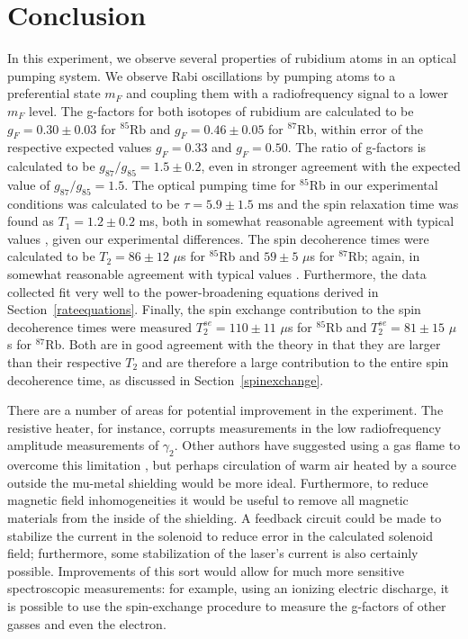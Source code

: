 
\section{Conclusion}\label{conclusion}

In this experiment, we observe several properties of rubidium atoms in an optical pumping system. We observe Rabi oscillations by pumping atoms to a preferential state $m_{F}$ and coupling them with a radiofrequency signal to a lower $m_{F}$ level. The g-factors for both isotopes of rubidium are calculated to be $g_{F}=0.30\pm0.03$ for $^{85}$Rb and $g_{F}=0.46\pm0.05$ for $^{87}$Rb, within error of the respective expected values $g_{F}=0.33$ and $g_{F}=0.50$. The ratio of g-factors is calculated to be $g_{87}/g_{85}=1.5\pm0.2$, even in stronger agreement with the expected value of $g_{87}/g_{85}=1.5$. The optical pumping time for $^{85}$Rb in our experimental conditions was calculated to be $\tau = 5.9\pm 1.5$ ms and the spin relaxation time was found as $T_{1}=1.2 \pm 0.2$ ms, both in somewhat reasonable agreement with typical values \cite{vanier}, given our experimental differences. The spin decoherence times were calculated to be $T_2 = 86 \pm 12$ $\mu$s for $^{85}$Rb and $59 \pm 5$ $\mu$s for $^{87}$Rb; again, in somewhat reasonable agreement with typical values \cite{vanier}. Furthermore, the data collected fit very well to the power-broadening equations derived in Section~\ref{rateequations}. Finally, the spin exchange contribution to the spin decoherence times were measured $T^{se}_2=110 \pm 11$ $\mu$s for  $^{85}$Rb and $T^{se}_2 = 81 \pm 15$ $\mu$s for  $^{87}$Rb. Both are in good agreement with the theory in that they are larger than their respective $T_{2}$ and are therefore a large contribution to the entire spin decoherence time, as discussed in Section~\ref{spinexchange}.

There are a number of areas for potential improvement in the experiment. The resistive heater, for instance, corrupts measurements in the low radiofrequency amplitude measurements of $\gamma_{2}$. Other authors have suggested using a gas flame to overcome this limitation \cite{benumof}, but perhaps circulation of warm air heated by a source outside the mu-metal shielding would be more ideal. Furthermore, to reduce magnetic field inhomogeneities it would be useful to remove all magnetic materials from the inside of the shielding. A feedback circuit could be made to stabilize the current in the solenoid to reduce error in the calculated solenoid field; furthermore, some stabilization of the laser's current is also certainly possible. Improvements of this sort would allow for much more sensitive spectroscopic measurements: for example, using an ionizing electric discharge, it is possible to use the spin-exchange procedure to measure the g-factors of other gasses and even the electron.